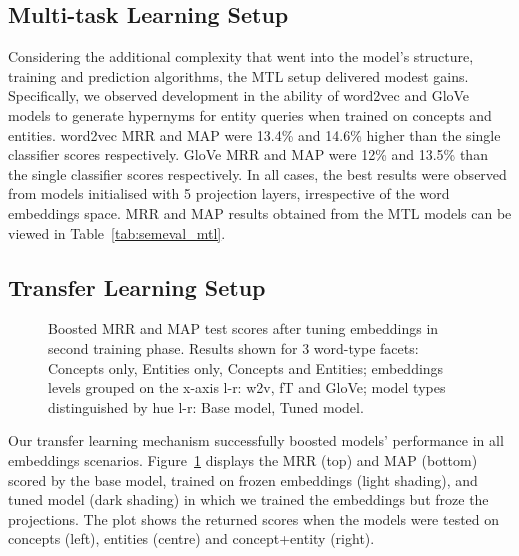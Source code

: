 \subsection{Multi-task Learning Setup}
Considering the additional complexity that went into the model's structure, training and prediction algorithms, the \ac{MTL} setup delivered modest gains.  Specifically, we observed development in the ability of word2vec and GloVe models to generate hypernyms for entity queries when trained on concepts and entities.  word2vec \ac{MRR} and \ac{MAP} were 13.4\%  and 14.6\% higher than the single classifier scores respectively.  GloVe \ac{MRR} and \ac{MAP} were 12\% and 13.5\% than the single classifier scores respectively.  In all cases, the best results were observed from models initialised with 5 projection layers, irrespective of the word embeddings space.  \ac{MRR} and \ac{MAP} results obtained from the \ac{MTL} models can be viewed in Table~\ref{tab:semeval_mtl}.

\subsection{Transfer Learning Setup}
\begin{figure}[!ht]
    \centering
    \qquad
    \caption[Boost on MRR and MAP test scores due to embeddings tuning]{Boosted MRR and MAP test scores after tuning embeddings in second training phase.  Results shown for 3 word-type facets: Concepts only, Entities only, Concepts and Entities; embeddings levels grouped on the x-axis l-r: w2v, fT and GloVe; model types distinguished by hue l-r: Base model, Tuned model.}
    \label{fig:embeddings_boost}
\end{figure}
Our transfer learning mechanism successfully boosted models' performance in all embeddings scenarios.  Figure~\ref{fig:embeddings_boost} displays the \ac{MRR} (top) and \ac{MAP} (bottom) scored by the base model, trained on frozen embeddings (light shading), and tuned model (dark shading) in which we trained the embeddings but froze the projections.  The plot shows the returned scores when the models were tested on concepts (left), entities (centre) and concept+entity (right).

